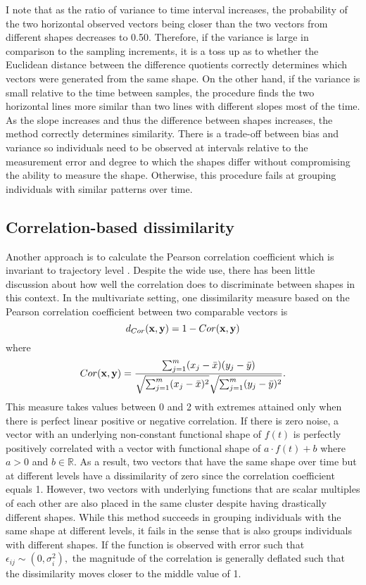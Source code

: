 I note that as the ratio of variance to time interval increases, the probability of the two horizontal observed vectors being closer than the two vectors from different shapes decreases to 0.50. Therefore, if the variance is large in comparison to the sampling increments, it is a toss up as to whether the Euclidean distance between the difference quotients correctly determines which vectors were generated from the same shape. On the other hand, if the variance is small relative to the time between samples, the procedure finds the two horizontal lines more similar than two lines with different slopes most of the time. As the slope increases and thus the difference between shapes increases, the method correctly determines similarity. There is a trade-off between bias and variance so individuals need to be observed at intervals relative to the measurement error and degree to which the shapes differ without compromising the ability to measure the shape. Otherwise, this procedure fails at grouping individuals with similar patterns over time. 

\subsection{Correlation-based dissimilarity}
Another approach is to calculate the Pearson correlation coefficient which is invariant to trajectory level \cite{chouakria2007, eisen1998, chiou2008}. Despite the wide use, there has been little discussion about how well the correlation does to discriminate between shapes in this context. In the multivariate setting, one dissimilarity measure based on the Pearson correlation coefficient between two comparable vectors is 
$$d_{Cor}(\mathbf x,\mathbf y) = 1-Cor(\mathbf x,\mathbf y)$$ 
where $$Cor(\mathbf x,\mathbf y) = \frac{\sum^{m}_{j=1}(x_{j}-\bar{x})(y_{j}-\bar{y})}{\sqrt{\sum^{m}_{j=1}(x_{j}-\bar{x})^{2}}\sqrt{\sum^{m}_{j=1}(y_{j}-\bar{y})^{2}}}.$$
This measure takes values between 0 and 2 with extremes attained only when there is perfect linear positive or negative correlation. If there is zero noise, a vector with an underlying non-constant functional shape of $f(t)$ is perfectly positively correlated with a vector with functional shape of $a\cdot f(t) + b$ where $a>0$ and $b\in\mathbb{R}$. As a result, two vectors that have the same shape over time but at different levels have a dissimilarity of zero since the correlation coefficient equals 1. However, two vectors with underlying functions that are scalar multiples of each other are also placed in the same cluster despite having drastically different shapes. While this method succeeds in grouping individuals with the same shape at different levels, it fails in the sense that is also groups individuals with different shapes. If the function is observed with error such that $\epsilon_{ij}\sim(0,\sigma_{i}^{2}),$ the magnitude of the correlation is generally deflated such that the dissimilarity moves closer to the middle value of 1.

